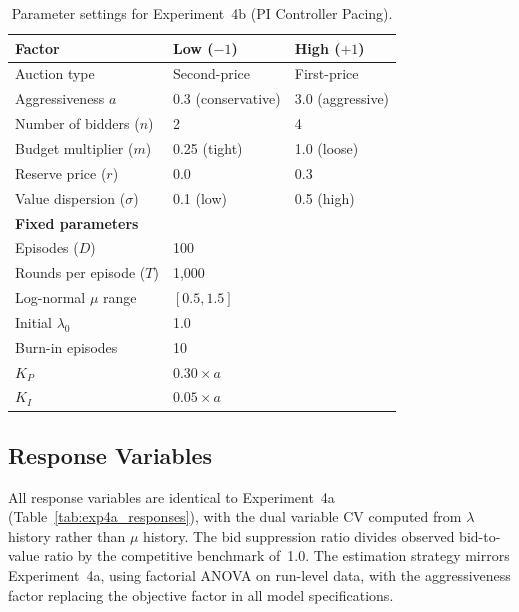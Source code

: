 \begin{table}[H]
\centering
\caption{Parameter settings for Experiment~4b (PI Controller Pacing).}
\label{tab:exp4bparams}
\begin{tabular}{l l l}
\toprule
\textbf{Factor} & \textbf{Low ($-1$)} & \textbf{High ($+1$)}\\
\midrule
Auction type & Second-price & First-price \\
Aggressiveness $a$ & 0.3 (conservative) & 3.0 (aggressive) \\
Number of bidders ($n$) & 2 & 4 \\
Budget multiplier ($m$) & 0.25 (tight) & 1.0 (loose) \\
Reserve price ($r$) & 0.0 & 0.3 \\
Value dispersion ($\sigma$) & 0.1 (low) & 0.5 (high) \\
\midrule
\multicolumn{3}{l}{\textbf{Fixed parameters}} \\
\midrule
Episodes ($D$) & \multicolumn{2}{l}{100} \\
Rounds per episode ($T$) & \multicolumn{2}{l}{1{,}000} \\
Log-normal $\mu$ range & \multicolumn{2}{l}{$[0.5, 1.5]$} \\
Initial $\lambda_0$ & \multicolumn{2}{l}{1.0} \\
Burn-in episodes & \multicolumn{2}{l}{10} \\
$K_P$ & \multicolumn{2}{l}{$0.30 \times a$} \\
$K_I$ & \multicolumn{2}{l}{$0.05 \times a$} \\
\bottomrule
\end{tabular}
\end{table}

\subsection{Response Variables}

All response variables are identical to Experiment~4a (Table~\ref{tab:exp4a_responses}), with the dual variable CV computed from $\lambda$ history rather than $\mu$ history. The bid suppression ratio divides observed bid-to-value ratio by the competitive benchmark of~1.0. The estimation strategy mirrors Experiment~4a, using factorial ANOVA on run-level data, with the aggressiveness factor replacing the objective factor in all model specifications.

